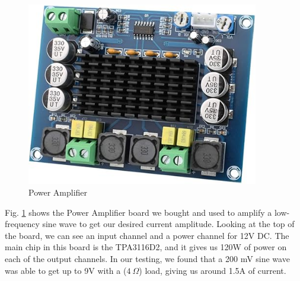 \begin{figure}[H]
    \centering
    \includegraphics[height=8cm]{power_amp.jpg}
    \caption{Power Amplifier}
    \label{fig:Power Amp}
\end{figure}
Fig. \ref{fig:Power Amp} shows the Power Amplifier board we bought and used to amplify a low-frequency sine wave to get our desired current amplitude. Looking at the top of the board, we can see an input channel and a power channel for 12V DC. The main chip in this board is the TPA3116D2, and it gives us 120W of power on each of the output channels. In our testing, we found that a 200 mV sine wave was able to get up to 9V with a ($4~\Omega$) load, giving us around 1.5A of current.